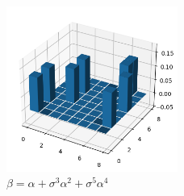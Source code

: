 \documentclass[a4paper]{article}
\begin{document}
  \begin{figure}[ht]
    \centering
    \includegraphics[width=0.5\textwidth]{090-2.png}
    \caption{$\beta = \alpha + \sigma^3 \alpha^2 + \sigma^5 \alpha^4$}
    \label{fig:090-2}
  \end{figure}
\end{document}
